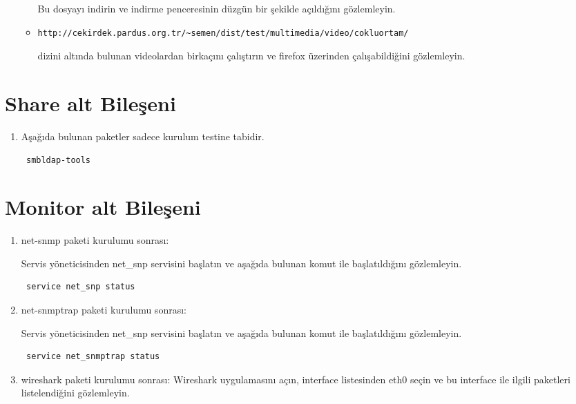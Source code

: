 \documentclass[a4paper,10pt]{article}
\begin{document}
\begin{enumerate}
\begin{itemize}
Bu dosyayı indirin ve indirme penceresinin düzgün bir şekilde açıldığını gözlemleyin.
\item \begin{verbatim}http://cekirdek.pardus.org.tr/~semen/dist/test/multimedia/video/cokluortam/\end{verbatim} dizini altında bulunan videolardan birkaçını çalıştırın ve firefox üzerinden çalışabildiğini gözlemleyin.

\end{itemize}

\end{enumerate}

\section{Share alt Bileşeni}
\begin{enumerate}
 \item Aşağıda bulunan paketler sadece kurulum testine tabidir.
\begin{verbatim}
 smbldap-tools
\end{verbatim}

\end{enumerate}

\section{Monitor alt Bileşeni}
\begin{enumerate}
 \item net-snmp paketi kurulumu sonrası:

Servis yöneticisinden net\_snp servisini başlatın ve aşağıda bulunan komut ile başlatıldığını gözlemleyin.
\begin{verbatim}
 service net_snp status
\end{verbatim}

\item net-snmptrap paketi kurulumu sonrası:

Servis yöneticisinden net\_snp servisini başlatın ve aşağıda bulunan komut ile başlatıldığını gözlemleyin.
\begin{verbatim}
 service net_snmptrap status
\end{verbatim}



 \item wireshark paketi kurulumu sonrası:
	Wireshark uygulamasını açın, interface listesinden eth0 seçin ve bu interface ile ilgili paketleri listelendiğini gözlemleyin.
\end{enumerate}
\end{document}
